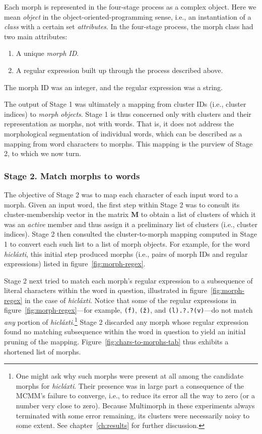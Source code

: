 {Each morph is represented in the four-stage process as a complex object. Here 
we mean \emph{object} in the object-oriented-programming sense, i.e., an instantiation of a \emph{class} with a certain set \emph{attributes}.
In the four-stage process, the morph class had two main attributes:
\begin{enumerate}
\item A unique \emph{morph ID}.
\item A regular expression built up through the process described above.
\end{enumerate}
The morph ID was an integer, and the regular expression was a string.

The output of Stage 1 was ultimately a mapping from cluster IDs (i.e., cluster indices) to \emph{morph objects}.
Stage 1 is thus concerned only with clusters and their representation as morphs, not with words. That is,
it does not address the morphological segmentation of individual words, which can
be described as a mapping from word characters to morphs. This mapping is the purview of Stage 2,
to which we now turn.

\subsubsection{Stage 2. Match morphs to words}
 
The objective of Stage 2 was to map each character of each input word to a morph.
Given an input word, the first step within Stage 2 was to consult its 
cluster-membership vector in the matrix $\mathbf{M}$ to obtain a list of clusters
of which it was an \emph{active} member and thus assign it a preliminary list 
of clusters (i.e., cluster indices).  
Stage 2 then consulted the cluster-to-morph mapping computed in 
Stage 1 to convert each such list to a list of morph objects.
For example, for the word \textit{hicl\'{a}xti},
this initial step produced
morphs (i.e., pairs of morph IDs and regular expressions)  listed in 
figure~\ref{fig:morph-regex}.


Stage 2 next tried to match each morph's regular expression to a subsequence of
literal characters within the word in question, 
illustrated in figure~\ref{fig:morph-regex}
in the case of \textit{hicl\'{a}xti}. 
Notice that some of the regular expressions in figure~\ref{fig:morph-regex}---for example,
\texttt{(f)}, \texttt{(\v{z})}, and \texttt{(l).?.?(v)}---do not
match \emph{any} portion of \textit{hicl\'{a}xti}.\footnote{One might ask 
why such morphs were present at all among the 
candidate morphs for \textit{hicl\'{a}xti}.  Their presence was in large part a 
consequence of the MCMM's failure to converge, i.e., to reduce its error all the 
way to zero (or a number very close to zero). Because Multimorph in these 
experiments always terminated with some error remaining, its clusters 
were necessarily noisy to some extent. See chapter~\ref{ch:results} for 
further discussion.}
Stage 2 discarded any morph whose regular expression found no matching subsequence 
within the word in question to yield an initial pruning of the mapping.  
Figure~\ref{fig:chars-to-morphs-tab} thus exhibits a shortened list of morphs.

}
